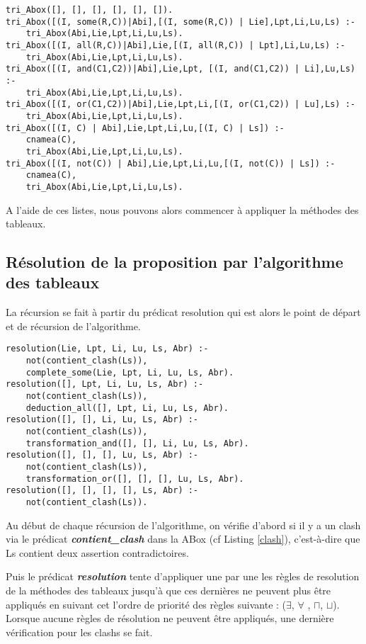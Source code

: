 \documentclass{rapportECL}
\begin{document}
\begin{lstlisting}[style=prologStyle, caption={Tri de la ABox}, label={tri_Abox}]
tri_Abox([], [], [], [], [], []).
tri_Abox([(I, some(R,C))|Abi],[(I, some(R,C)) | Lie],Lpt,Li,Lu,Ls) :-
    tri_Abox(Abi,Lie,Lpt,Li,Lu,Ls).
tri_Abox([(I, all(R,C))|Abi],Lie,[(I, all(R,C)) | Lpt],Li,Lu,Ls) :-
    tri_Abox(Abi,Lie,Lpt,Li,Lu,Ls).
tri_Abox([(I, and(C1,C2))|Abi],Lie,Lpt, [(I, and(C1,C2)) | Li],Lu,Ls) :-
    tri_Abox(Abi,Lie,Lpt,Li,Lu,Ls).
tri_Abox([(I, or(C1,C2))|Abi],Lie,Lpt,Li,[(I, or(C1,C2)) | Lu],Ls) :-
    tri_Abox(Abi,Lie,Lpt,Li,Lu,Ls).
tri_Abox([(I, C) | Abi],Lie,Lpt,Li,Lu,[(I, C) | Ls]) :-
    cnamea(C),
    tri_Abox(Abi,Lie,Lpt,Li,Lu,Ls).
tri_Abox([(I, not(C)) | Abi],Lie,Lpt,Li,Lu,[(I, not(C)) | Ls]) :-
    cnamea(C),
    tri_Abox(Abi,Lie,Lpt,Li,Lu,Ls).
\end{lstlisting}

A l'aide de ces listes, nous pouvons alors commencer à appliquer la méthodes des tableaux.

\newpage

\subsection{Résolution de la proposition par l'algorithme des tableaux}

La récursion se fait à partir du prédicat resolution qui est alors le point de départ et de récursion de l'algorithme.

\begin{lstlisting}[style=prologStyle, caption={Resolution}, label={resolution}]
resolution(Lie, Lpt, Li, Lu, Ls, Abr) :-
    not(contient_clash(Ls)),
    complete_some(Lie, Lpt, Li, Lu, Ls, Abr).
resolution([], Lpt, Li, Lu, Ls, Abr) :-
    not(contient_clash(Ls)),
    deduction_all([], Lpt, Li, Lu, Ls, Abr).
resolution([], [], Li, Lu, Ls, Abr) :- 
    not(contient_clash(Ls)),
    transformation_and([], [], Li, Lu, Ls, Abr).
resolution([], [], [], Lu, Ls, Abr) :-
    not(contient_clash(Ls)),
    transformation_or([], [], [], Lu, Ls, Abr).
resolution([], [], [], [], Ls, Abr) :-
    not(contient_clash(Ls)).
\end{lstlisting}

Au début de chaque récursion de l'algorithme, on vérifie d'abord si il y a un clash via le prédicat \textbf{\textit{contient\_clash}} dans la ABox (cf Listing \ref{clash}), c'est-à-dire que Ls contient deux assertion contradictoires.

Puis le prédicat \textbf{\textit{resolution}} tente d'appliquer une par une les règles de resolution de la méthodes des tableaux jusqu'à que ces dernières ne peuvent plus être appliqués en suivant cet l'ordre de priorité des règles suivante : (\textit{\( \exists \)}, \textit{\( \forall \) }, \textit{\( \sqcap \)}, \textit{\( \sqcup \)}).
Lorsque aucune règles de résolution ne peuvent être appliqués, une dernière vérification pour les clashs se fait.
\end{document}
